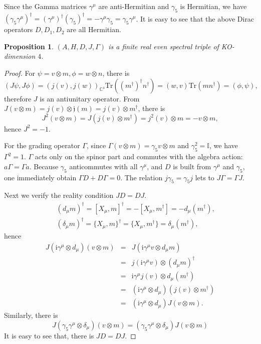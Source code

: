 \documentclass[a4paper,11pt]{article}
\newtheorem{proposition}{Proposition}
\begin{document}
Since the Gamma matrices $\gamma^{\mu}$ are anti-Hermitian and $\gamma_5$ is
Hermitian, we have $(\gamma_5 \gamma^{\mu})^{\dag} = (\gamma^{\mu})^{\dag}
(\gamma_5)^{\dag} = - \gamma^{\mu} \gamma_5 = \gamma_5 \gamma^{\mu}$. It is
easy to see that the above Dirac operators $D, D_1, D_2$ are all Hermitian.

\begin{proposition}
  $(A, H, D, J, \Gamma)$ is a finite real even spectral triple of
  KO-dimension $4$.
\end{proposition}

\begin{proof}
  For $\psi = v \otimes m, \phi = w \otimes n$, there is
  \begin{equation}
  	(J \psi, J \phi) = (j (v), j (w))_{\mathbb{C}^4} \mathrm{Tr} ((m^{\dag})^{\dag} n^{\dag}) 
  	= (w, v) \mathrm{Tr} (mn^{\dag}) = (\phi, \psi),
  \end{equation}
  therefore $J$ is an antiunitary operator. From $J (v \otimes m) = j (v)
  \otimes \mathfrak{j} (m) = j (v) \otimes m^{\dag}$, there is
    \begin{equation}
    J^2  (v \otimes m) = J (j (v) \otimes m^{\dag}) = j^2 (v) \otimes m = - v
    \otimes m,
  \end{equation}
  hence $J^2 = - 1$.
  
  For the grading operator $\Gamma$, since $\Gamma (v \otimes m) =
  \gamma_5 v \otimes m$ and $\gamma_5^2 = \mathbb{I}$, we have $\Gamma^2 = 1$. $\Gamma$
  acts only on the spinor part and commutes with the algebra action: $a \Gamma
  = \Gamma a$. Because $\gamma_5$ anticommutes with all $\gamma^\mu$, and $D$ is
  built from $\gamma^\mu$ and $\gamma_5$, one immediately obtain $\Gamma D + D
  \Gamma = 0$. The relation $j \gamma_5 = \gamma_5 j$ lets to $J \Gamma = \Gamma J$.

  
  Next we verify the reality condition $JD = DJ$.
  \begin{eqnarray}
&&    (d_\mu m)^{\dag} = [X_\mu, m]^{\dag} = - [X_\mu, m^{\dag}] = - d_\mu (m^{\dag}),
\nonumber\\
&&    (\delta_\mu m)^{\dag} = \{X_\mu, m\}^{\dag} = \{X_\mu, m^{\dag} \} = \delta_\mu
    (m^{\dag}),
  \end{eqnarray}
  hence
  \begin{eqnarray}
    J (\mathrm{i} \gamma^\mu \otimes d_\mu)  (v \otimes m) & = & J (\mathrm{i} \gamma^\mu v \otimes
    d_\mu m) \nonumber\\
    & = & j (\mathrm{i} \gamma^\mu v) \otimes (d_\mu m)^{\dag} \nonumber\\
    & = & \mathrm{i} \gamma^\mu j (v) \otimes d_\mu (m^{\dag}) \nonumber\\
    & = & (\mathrm{i} \gamma^\mu \otimes d_\mu)  (j (v) \otimes m^{\dag}) \nonumber\\
    & = & (\mathrm{i} \gamma^\mu \otimes d_\mu) J (v \otimes m). 
  \end{eqnarray}
 Similarly, there is
  \begin{equation}
    J (\gamma_5 \gamma^\mu \otimes \delta_\mu)  (v \otimes m) = (\gamma_5 \gamma^\mu \otimes \delta_\mu) J (v \otimes m) 
  \end{equation}
 It is easy to see that, there is $JD = DJ$.
  

\end{proof}
\end{document}
